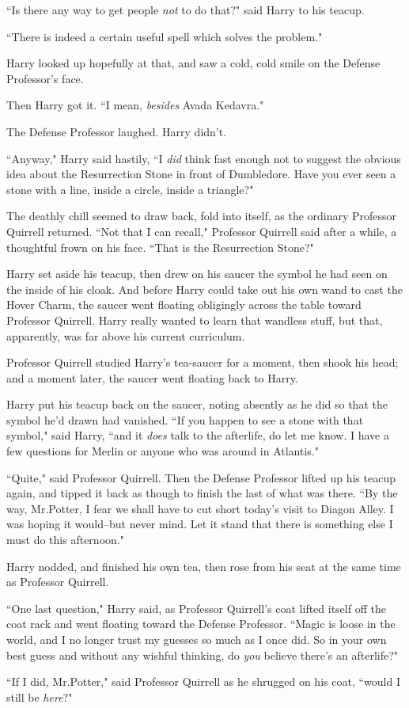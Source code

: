 ``Is there any way to get people \emph{not} to do that?" said Harry to his teacup.

``There is indeed a certain useful spell which solves the problem."

Harry looked up hopefully at that, and saw a cold, cold smile on the Defense Professor's face.

Then Harry got it. ``I mean, \emph{besides} Avada Kedavra."

The Defense Professor laughed. Harry didn't.

``Anyway," Harry said hastily, ``I \emph{did} think fast enough not to suggest the obvious idea about the Resurrection Stone in front of Dumbledore. Have you ever seen a stone with a line, inside a circle, inside a triangle?"

The deathly chill seemed to draw back, fold into itself, as the ordinary Professor Quirrell returned. ``Not that I can recall," Professor Quirrell said after a while, a thoughtful frown on his face. ``That is the Resurrection Stone?"

Harry set aside his teacup, then drew on his saucer the symbol he had seen on the inside of his cloak. And before Harry could take out his own wand to cast the Hover Charm, the saucer went floating obligingly across the table toward Professor Quirrell. Harry really wanted to learn that wandless stuff, but that, apparently, was far above his current curriculum.

Professor Quirrell studied Harry's tea-saucer for a moment, then shook his head; and a moment later, the saucer went floating back to Harry.

Harry put his teacup back on the saucer, noting absently as he did so that the symbol he'd drawn had vanished. ``If you happen to see a stone with that symbol," said Harry, ``and it \emph{does} talk to the afterlife, do let me know. I have a few questions for Merlin or anyone who was around in Atlantis."

``Quite," said Professor Quirrell. Then the Defense Professor lifted up his teacup again, and tipped it back as though to finish the last of what was there. ``By the way, Mr.\?Potter, I fear we shall have to cut short today's visit to Diagon Alley. I was hoping it would\---but never mind. Let it stand that there is something else I must do this afternoon."

Harry nodded, and finished his own tea, then rose from his seat at the same time as Professor Quirrell.

``One last question," Harry said, as Professor Quirrell's coat lifted itself off the coat rack and went floating toward the Defense Professor. ``Magic is loose in the world, and I no longer trust my guesses so much as I once did. So in your own best guess and without any wishful thinking, do \emph{you} believe there's an afterlife?"

``If I did, Mr.\?Potter," said Professor Quirrell as he shrugged on his coat, ``would I still be \emph{here}?"

